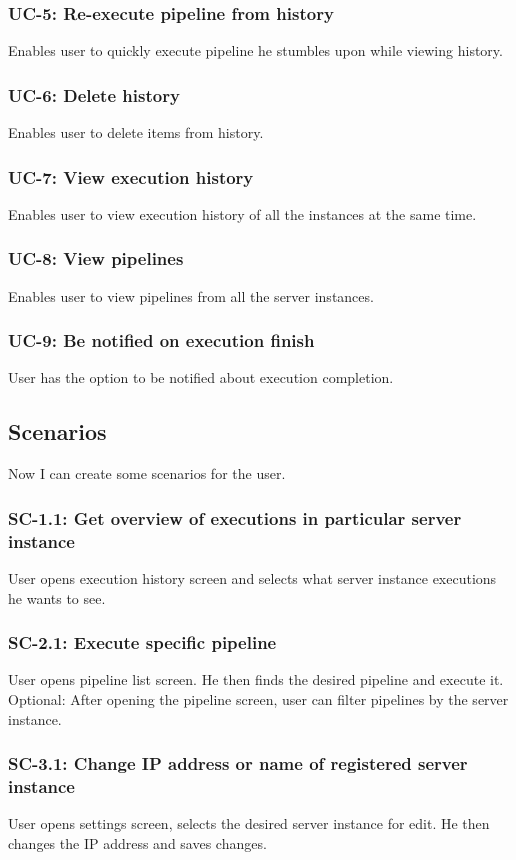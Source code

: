\subsubsection*{UC-5: Re-execute pipeline from history}
Enables user to quickly execute pipeline he stumbles upon while viewing history.
\subsubsection*{UC-6: Delete history}
Enables user to delete items from history.
\subsubsection*{UC-7: View execution history}
Enables user to view execution history of all the instances at the same time.
\subsubsection*{UC-8: View pipelines}
Enables user to view pipelines from all the server instances.
\subsubsection*{UC-9: Be notified on execution finish}
User has the option to be notified about execution completion.

\subsection{Scenarios}
Now I can create some scenarios for the user.

\subsubsection*{SC-1.1: Get overview of executions in particular server instance}
User opens execution history screen and selects what server instance executions he wants to see.
\subsubsection*{SC-2.1: Execute specific pipeline}
User opens pipeline list screen. He then finds the desired pipeline and execute it. Optional: After opening the pipeline screen, user can filter pipelines by the server instance.
\subsubsection*{SC-3.1: Change IP address or name of registered server instance}
User opens settings screen, selects the desired server instance for edit. He then changes the IP address and saves changes.
